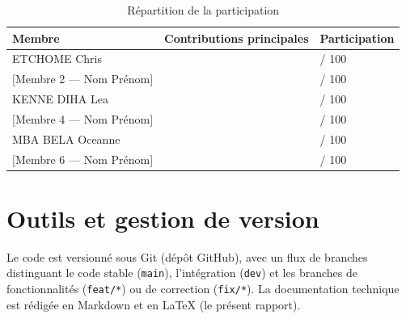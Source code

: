 \begin{table}[H]
\centering
\caption{Répartition de la participation}
\label{tab:participation}
\renewcommand{\arraystretch}{1.3}
\begin{tabularx}{\linewidth}{L{6cm} X C{2.6cm}}
\toprule
\textbf{Membre} & \textbf{Contributions principales} & \textbf{Participation} \\
\midrule
ETCHOME Chris           & \dotfill & \underline{\hspace{1cm}} / 100 \\
{[Membre 2 — Nom Prénom]} & \dotfill & \underline{\hspace{1cm}} / 100 \\
KENNE DIHA Lea & \dotfill & \underline{\hspace{1cm}} / 100 \\
{[Membre 4 — Nom Prénom]} & \dotfill & \underline{\hspace{1cm}} / 100 \\
MBA BELA Oceanne & \dotfill & \underline{\hspace{1cm}} / 100 \\
{[Membre 6 — Nom Prénom]} & \dotfill & \underline{\hspace{1cm}} / 100 \\
\bottomrule
\end{tabularx}
\end{table}

\section{Outils et gestion de version}

Le code est versionné sous Git (dépôt GitHub), avec un flux de branches distinguant le code
stable (\texttt{main}), l'intégration (\texttt{dev}) et les branches de fonctionnalités
(\texttt{feat/*}) ou de correction (\texttt{fix/*}). La documentation technique est rédigée
en Markdown et en \LaTeX{} (le présent rapport).
\fi
